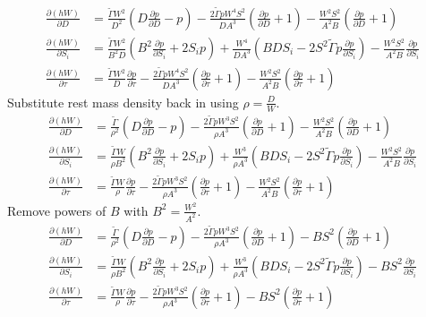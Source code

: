 \documentclass{article}
\begin{document}
\begin{align*}
  \frac{\partial (hW)}{\partial D} &= \frac{\widetilde{\Gamma} W^{2}}{D^{2}} \left(D \frac{\partial p}{\partial D} - p\right) - \frac{2 \widetilde{\Gamma} p W^4 S^2}{D A^3} \left(\frac{\partial p}{\partial D} + 1\right) - \frac{W^2 S^{2}}{A^2 B}\left(\frac{\partial p}{\partial D} + 1\right)\\
  \frac{\partial (hW)}{\partial S_i} &= \frac{\widetilde{\Gamma} W^2}{B^2 D} \left(B^{2}  \frac{\partial p}{\partial S_i} + 2 S_i p\right) + \frac{W^4}{D A^3} \left(B D S_i - 2 S^{2} \widetilde{\Gamma} p \frac{\partial p}{\partial S_i}\right) - \frac{W^2 S^{2}}{A^2 B} \frac{\partial p}{\partial S_i}\\
  \frac{\partial (hW)}{\partial \tau} &= \frac{\widetilde{\Gamma} W^2}{D} \frac{\partial p}{\partial \tau} - \frac{2 \widetilde{\Gamma} p W^4 S^2}{D A^3} \left(\frac{\partial p}{\partial \tau} + 1\right) - \frac{W^2 S^{2}}{A^2 B} \left(\frac{\partial p}{\partial \tau} + 1\right)
\end{align*}
Substitute rest mass density back in using $\rho = \frac{D}{W}$.
\begin{align*}
  \frac{\partial (hW)}{\partial D} &= \frac{\widetilde{\Gamma}}{\rho^{2}} \left(D \frac{\partial p}{\partial D} - p\right) - \frac{2 \widetilde{\Gamma} p W^3 S^2}{\rho A^3} \left(\frac{\partial p}{\partial D} + 1\right) - \frac{W^2 S^{2}}{A^2 B}\left(\frac{\partial p}{\partial D} + 1\right)\\
  \frac{\partial (hW)}{\partial S_i} &= \frac{\widetilde{\Gamma} W}{\rho B^2} \left(B^{2}  \frac{\partial p}{\partial S_i} + 2 S_i p\right) + \frac{W^3}{\rho A^3} \left(B D S_i - 2 S^{2} \widetilde{\Gamma} p \frac{\partial p}{\partial S_i}\right) - \frac{W^2 S^{2}}{A^2 B} \frac{\partial p}{\partial S_i}\\
  \frac{\partial (hW)}{\partial \tau} &= \frac{\widetilde{\Gamma} W}{\rho} \frac{\partial p}{\partial \tau} - \frac{2 \widetilde{\Gamma} p W^3 S^2}{\rho A^3} \left(\frac{\partial p}{\partial \tau} + 1\right) - \frac{W^2 S^{2}}{A^2 B} \left(\frac{\partial p}{\partial \tau} + 1\right)
\end{align*}
Remove powers of $B$ with $B^2 = \frac{W^2}{A^2}$.
\begin{align*}
  \frac{\partial (hW)}{\partial D} &= \frac{\widetilde{\Gamma}}{\rho^{2}} \left(D \frac{\partial p}{\partial D} - p\right) - \frac{2 \widetilde{\Gamma} p W^3 S^2}{\rho A^3} \left(\frac{\partial p}{\partial D} + 1\right) - B S^2\left(\frac{\partial p}{\partial D} + 1\right)\\
  \frac{\partial (hW)}{\partial S_i} &= \frac{\widetilde{\Gamma} W}{\rho B^2} \left(B^{2}  \frac{\partial p}{\partial S_i} + 2 S_i p\right) + \frac{W^3}{\rho A^3} \left(B D S_i - 2 S^{2} \widetilde{\Gamma} p \frac{\partial p}{\partial S_i}\right) - B S^2 \frac{\partial p}{\partial S_i}\\
  \frac{\partial (hW)}{\partial \tau} &= \frac{\widetilde{\Gamma} W}{\rho} \frac{\partial p}{\partial \tau} - \frac{2 \widetilde{\Gamma} p W^3 S^2}{\rho A^3} \left(\frac{\partial p}{\partial \tau} + 1\right) - B S^2 \left(\frac{\partial p}{\partial \tau} + 1\right)
\end{align*}
\end{document}

